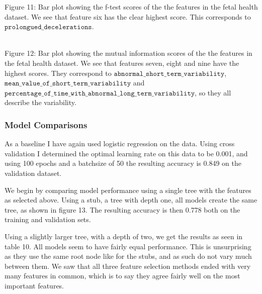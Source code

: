 \documentclass[11pt]{article}
\begin{document}
 Figure 11: Bar plot showing the f-test scores of the the
 features in the fetal health dataset. We see that feature six has the
 clear highest score. This corresponds to $\texttt{prolongued\_decelerations}$.
 

 
 \begin{center}
 \end{center}
 { \hspace*{\fill} \\}
 Figure 12: Bar plot showing the mutual information scores of the the
 features in the fetal health dataset. We see that features seven, eight and nine have the highest scores. They correspond to 
 $\texttt{abnormal\_short\_term\_variability}$, $\texttt{mean\_value\_of\_short\_term\_variability}$ and $\texttt{percentage\_of\_time\_with\_abnormal\_long\_term\_variability}$, so they all describe the variability.
  
     \hypertarget{model-comparisons2}{%
 	\subsubsection{Model Comparisons}\label{model-comparisons2}}

As a baseline I have again used logistic regression on the data. Using cross validation I determined the optimal learning rate on this data to be 0.001, and using 100 epochs and a batchsize of 50 the resulting accuracy is 0.849 on the validation dataset.

We begin by comparing model performance using a single tree with the features as selected above. Using a stub, a tree with depth one, all models create the same tree, as shown in figure 13. The resulting accuracy is then 0.778 both on the training and validation sets.

Using a slightly larger tree, with a depth of two, we get the results as seen in table 10. All models seem to have fairly equal performance. This is unsurprising as they use the same root node like for the stubs, and as such do not vary much between them. We saw that all three feature selection methods ended with very many features in common, which is to say they agree fairly well on the most important features. 
\end{document}
